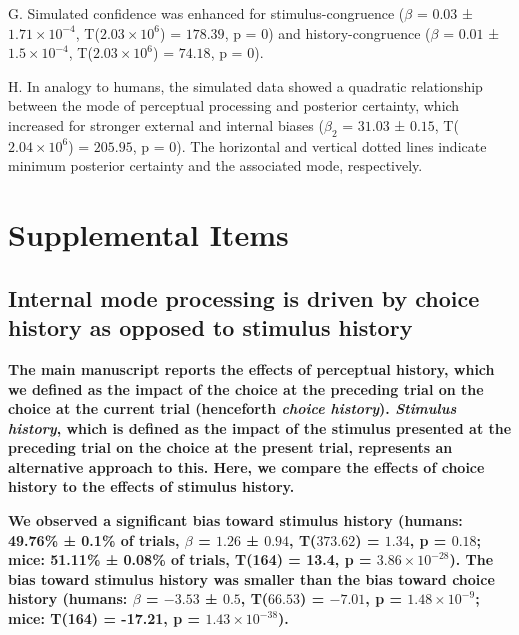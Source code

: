 \documentclass[
]{article}
\begin{document}
G. Simulated confidence was enhanced for stimulus-congruence (\(\beta\)
= \(0.03\) ± \(\ensuremath{1.71\times 10^{-4}}\),
T(\(\ensuremath{2.03\times 10^{6}}\)) = \(178.39\), p = \(0\)) and
history-congruence (\(\beta\) = \(0.01\) ±
\(\ensuremath{1.5\times 10^{-4}}\),
T(\(\ensuremath{2.03\times 10^{6}}\)) = \(74.18\), p = \(0\)).

H. In analogy to humans, the simulated data showed a quadratic
relationship between the mode of perceptual processing and posterior
certainty, which increased for stronger external and internal biases
(\(\beta_2\) = \(31.03\) ± \(0.15\),
T(\(\ensuremath{2.04\times 10^{6}}\)) = \(205.95\), p = \(0\)). The
horizontal and vertical dotted lines indicate minimum posterior
certainty and the associated mode, respectively.

\hypertarget{supplemental-items}{%
\section{Supplemental Items}\label{supplemental-items}}

\hypertarget{internal-mode-processing-is-driven-by-choice-history-as-opposed-to-stimulus-history}{%
\subsection{Internal mode processing is driven by choice history as
opposed to stimulus
history}\label{internal-mode-processing-is-driven-by-choice-history-as-opposed-to-stimulus-history}}

\textbf{The main manuscript reports the effects of perceptual history,
which we defined as the impact of the choice at the preceding trial on
the choice at the current trial (henceforth \emph{choice history}).
\emph{Stimulus history}, which is defined as the impact of the stimulus
presented at the preceding trial on the choice at the present trial,
represents an alternative approach to this. Here, we compare the effects
of choice history to the effects of stimulus history.}

\textbf{We observed a significant bias toward stimulus history (humans:
49.76\% ± 0.1\% of trials, \(\beta\) = \(1.26\) ± \(0.94\),
T(\(373.62\)) = \(1.34\), p = \(0.18\); mice: 51.11\% ± 0.08\% of
trials, T(164) = 13.4, p = \(\ensuremath{3.86\times 10^{-28}}\)). The
bias toward stimulus history was smaller than the bias toward choice
history (humans: \(\beta\) = \(-3.53\) ± \(0.5\), T(\(66.53\)) =
\(-7.01\), p = \(\ensuremath{1.48\times 10^{-9}}\); mice: T(164) =
-17.21, p = \(\ensuremath{1.43\times 10^{-38}}\)).}
\end{document}
